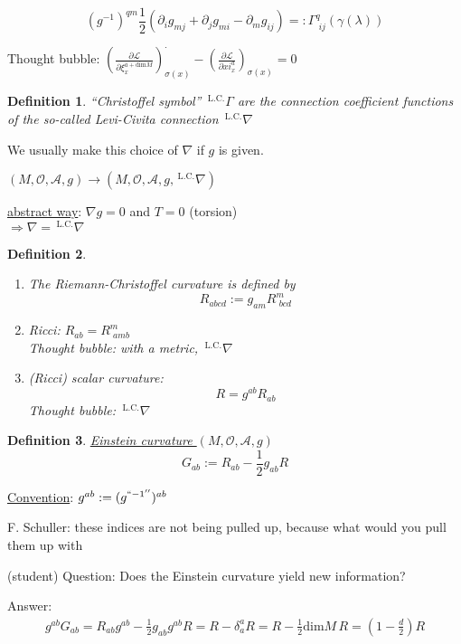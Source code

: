 \documentclass[10pt]{amsart}
\newtheorem{definition}{Definition}
\begin{document}
\begin{multicols*}{2}
	\[
	\boxed{ (g^{-1})^{qm}\frac{1}{2} (\partial_i g_{mj} + \partial_j g_{mi} -  \partial_m g_{ij} ) =: \Gamma^q_{ \,\, ij}(\gamma(\lambda))
	}
	\]
	
	Thought bubble: $\left( \frac{ \partial \mathcal{L}}{ \partial \xi_x^{a+\text{dim}M } } \right)^{\cdot}_{\sigma(x)} - \left( \frac{ \partial \mathcal{L}}{ \partial xi^a_x } \right)_{\sigma(x)} = 0$
	
	\begin{definition}
		``Christoffel symbol''   ${\,}^{\text{L.C.}}\Gamma$ are the connection coefficient functions of the so-called Levi-Civita connection ${\,}^{\text{L.C.}}\nabla$
	\end{definition}
	We usually make this choice of $\nabla$ if $g$ is given.  
	
	$(M,\mathcal{O}, \mathcal{A},g) \to (M,\mathcal{O}, \mathcal{A}, g, {\,}^{\text{L.C.}}\nabla)$
	
	\underline{abstract way}: $\nabla g = 0$ and $T=0$ (torsion) \\
	$\Longrightarrow \nabla = {\,}^{\text{L.C.}}\nabla$
	
	
	\begin{definition}
		\begin{enumerate}
			\item[(a)]
			The Riemann-Christoffel curvature is defined by 
			\[
			R_{abcd} := g_{am}R^m_{\,\,bcd}
			\]
			\item[(b)] Ricci: $R_{ab} = R^m_{\,\,amb}$ \\
			Thought bubble: with a metric, ${\,}^{\text{L.C.}}\nabla$
			\item[(c)] (Ricci) scalar curvature:
			\[
			R = g^{ab} R_{ab}
			\]
			Thought bubble: ${\,}^{\text{L.C.}}\nabla$
		\end{enumerate}
	\end{definition}
	
	\begin{definition}
		\underline{ Einstein curvature } $(M,\mathcal{O}, \mathcal{A},g)$
		\[
		G_{ab}:= R_{ab} - \frac{1}{2} g_{ab} R
		\]
	\end{definition}
	
	\underline{Convention}: $g^{ab} := (g^{``-1''})^{ab}$
	
	F. Schuller: these indices are not being pulled up, because what would you pull them up with
	
	(student) Question: Does the Einstein curvature yield new information?
	
	Answer: 
	\[
	\begin{gathered}
	g^{ab} G_{ab} = R_{ab} g^{ab} - \frac{1}{2} g_{ab} g^{ab} R = R - \delta^a_a R = R - \frac{1}{2} \text{dim}M \, R = (1- \frac{d}{2}) R
	\end{gathered}
	\]
	

\end{multicols*}
\end{document}
